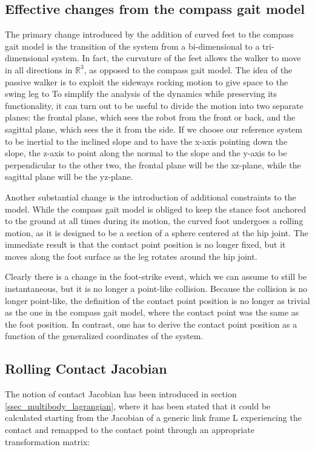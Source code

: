 \subsection{Effective changes from the compass gait model}
The primary change introduced by the addition of curved feet to the compass gait model is the transition of the system from a bi-dimensional to a tri-dimensional system.
In fact, the curvature of the feet allows the walker to move in all directions in $\mathbb{R}^3$, as opposed to the compass gait model. 
The idea of the passive walker is to exploit the sideways rocking motion to give space to the swing leg to %
To simplify the analysis of the dynamics while preserving its functionality, it can turn out to be useful to divide the motion into two separate planes: the frontal plane, which sees the robot from the front or back, and the sagittal plane, which sees the it from the side.
If we choose our reference system to be inertial to the inclined slope and to have the x-axis pointing down the slope, the z-axis to point along the normal to the slope and the y-axis to be perpendicular to the other two, the frontal plane will be the xz-plane, while the sagittal plane will be the yz-plane.

Another substantial change is the introduction of additional constraints to the model.
While the compass gait model is obliged to keep the stance foot anchored to the ground at all times during its motion, the curved foot undergoes a rolling motion, as it is designed to be a section of a sphere centered at the hip joint.
The immediate result is that the contact point position is no longer fixed, but it moves along the foot surface as the leg rotates around the hip joint.

Clearly there is a change in the foot-strike event, which we can assume to still be instantaneous, but it is no longer a point-like collision.
Because the collision is no longer point-like, the definition of the contact point position is no longer as trivial as the one in the compass gait model, where the contact point was the same as the foot position.
In contrast, one has to derive the contact point position as a function of the generalized coordinates of the system.

\subsection{Rolling Contact Jacobian}
The notion of contact Jacobian has been introduced in section \ref{ssec_multibody_lagrangian}, where it has been stated that it could be calculated starting from the Jacobian of a generic link frame L experiencing the contact and remapped to the contact point through an appropriate transformation matrix:

